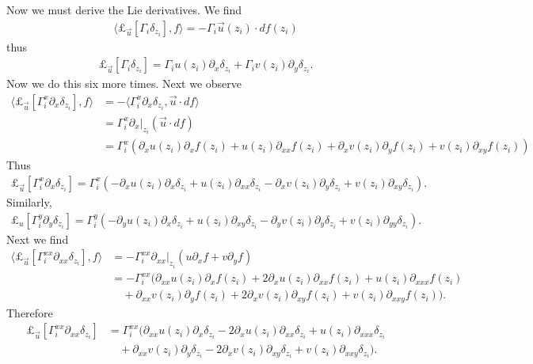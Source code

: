\documentclass[12pt]{amsart}
\begin{document}
Now we must derive the Lie derivatives.  We find
\begin{align*}
  \langle \pounds_{\vec{u}}[\Gamma_i \delta_{z_i}] , f \rangle = - \Gamma_i \vec{u}(z_i) \cdot df(z_i)
\end{align*}
thus
\begin{align*}
  \pounds_{\vec{u}}[\Gamma_i \delta_{z_i}] = \Gamma_i u(z_i) \partial_x \delta_{z_i}
  + \Gamma_i v(z_i) \partial_y \delta_{z_i}.
\end{align*}
Now we do this six more times.  Next we observe
\begin{align*}
  \langle \pounds_{\vec{u}}[\Gamma^x_i \partial_x\delta_{z_i}] , f \rangle &= 
  - \langle \Gamma^x_i \partial_x \delta_{z_i} , \vec{u} \cdot df \rangle \\
  &= \Gamma_i^x \partial_x|_{z_i}( \vec{u} \cdot df ) \\
  &= \Gamma_i^x 
  (\partial_x u(z_i) \partial_xf(z_i) +
   u(z_i) \partial_{xx}f(z_i) +
   \partial_x v(z_i) \partial_yf(z_i) +
   v(z_i) \partial_{xy}f(z_i) )
\end{align*}
Thus
\begin{align*}
\pounds_{\vec{u}}[\Gamma_i^x \partial_x\delta_{z_i}] = \Gamma_i^x ( -\partial_xu(z_i) \partial_x\delta_{z_i} + u(z_i) \partial_{xx} \delta_{z_i} - \partial_x v(z_i) \partial_y \delta_{z_i} + v(z_i) \partial_{xy} \delta_{z_i} ).
\end{align*} 
Similarly,
\begin{align*}
\pounds_u[\Gamma_i^y \partial_y\delta_{z_i}] = \Gamma_i^y ( -\partial_yu(z_i) \partial_x\delta_{z_i} + u(z_i) \partial_{xy} \delta_{z_i} - \partial_y v(z_i) \partial_y \delta_{z_i} + v(z_i) \partial_{yy} \delta_{z_i} ).
\end{align*}
Next we find
\begin{align*}
	\langle \pounds_{\vec{u}}[ \Gamma_i^{xx} \partial_{xx}\delta_{z_i}] , f \rangle &=- \Gamma_i^{xx} \partial_{xx} |_{z_i}( u \partial_x f + v \partial_y f) \\
		&= -\Gamma_i^{xx} \Big( \partial_{xx}u(z_i) \partial_x f(z_i) + 2 \partial_xu(z_i) \partial_{xx}f(z_i) + u(z_i) \partial_{xxx} f(z_i) \\
		& \quad + \partial_{xx}v(z_i) \partial_y f(z_i) + 2 \partial_xv(z_i) \partial_{xy}f(z_i) + v(z_i) \partial_{xxy} f(z_i) \Big).
\end{align*}
Therefore
\begin{align*}
	\pounds_{\vec{u}}[ \Gamma_i^{xx} \partial_{xx}\delta_{z_i}] &=
		\Gamma_i^{xx} \Big( \partial_{xx}u(z_i) \partial_x \delta_{z_i} - 2 \partial_xu(z_i) \partial_{xx} \delta_{z_i} + u(z_i) \partial_{xxx} \delta_{z_i} \\
		& \quad + \partial_{xx}v(z_i) \partial_y \delta_{z_i} - 2 \partial_xv(z_i) \partial_{xy}\delta_{z_i} + v(z_i) \partial_{xxy} \delta_{z_i} \Big).
\end{align*}
\end{document}
